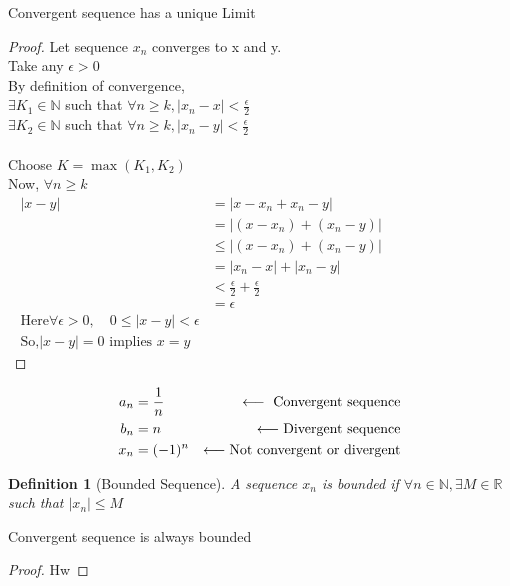 \documentclass{article}
\newtheorem{definition}{Definition}[section]
\newcommand{\hs}{\hspace}
\begin{document}
\begin{theorem}{}{}
    Convergent sequence has a unique Limit
    \begin{proof}
        Let sequence $x_n$ converges to x and y.\\
        Take any $\epsilon>0$\\
        By definition of convergence,\\
        $\exists K_1 \in \mathbb{N}$\; such that $\forall n \geq k, |x_n-x|<\frac{\epsilon}{2}$\\
        $\exists K_2 \in \mathbb{N}$\; such that $\forall n \geq k, |x_n-y|<\frac{\epsilon}{2}$\\\\
        Choose $K=\max(K_1,K_2)$\\Now, $\forall n\geq k$\\
        \begin{align*}
            |x-y| & =|x-x_n+x_n-y|  \hs{5cm}                        \\
                  & = |(x-x_n)+(x_n-y)|                             \\
                  & \leq |(x-x_n)+(x_n-y)|                          \\
                  & = |x_n-x|+|x_n-y|                               \\
                  & < \frac{\epsilon}{2}+\frac{\epsilon}{2}         \\
                  & = \epsilon                                      \\
            \text{Here}\forall \epsilon>0,\quad 0\leq|x-y|<\epsilon \\
            \text{So,}|x-y|=0 \text{  implies  }x=y
        \end{align*}
    \end{proof}
\end{theorem}
\begin{align*}
    a_n & =\frac{1}{n} & \longleftarrow  \text{ Convergent sequence}\hs*{\fill} \\
    b_n & =n           & \longleftarrow  \text{Divergent sequence}\hs*{\fill}   \\
    x_n & =(-1)^n      & \longleftarrow   \text{Not convergent or divergent}    \\
\end{align*}
\begin{definition}[Bounded Sequence]
    A sequence $x_n$ is bounded if $\forall n \in \mathbb{N},\exists M \in \mathbb{R} $ such that $|x_n|\leq M$\\
\end{definition}
\begin{theorem}{}{}
    Convergent sequence is always bounded
\begin{proof}
    Hw
\end{proof}
\end{theorem}
\end{document}
